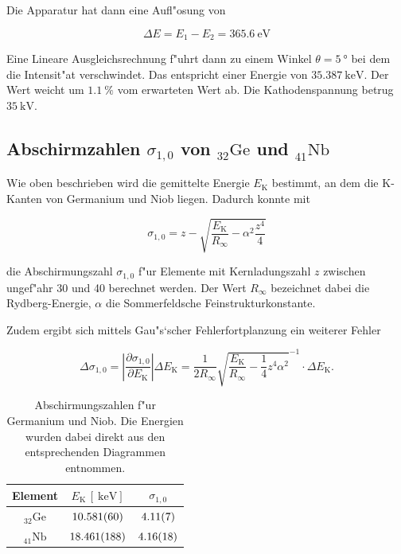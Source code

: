 		Die Apparatur hat dann eine Aufl"osung von

		\begin{equation}
			\Delta E = E_1 - E_2 = \SI{365.6}{\electronvolt} \nonumber
		\end{equation}

		Eine Lineare Ausgleichsrechnung f"uhrt dann zu einem Winkel $\theta = \SI{5}{\degree}$ bei dem die Intensit"at verschwindet.
		Das entspricht einer Energie von $\SI{35.387}{\kilo \electronvolt}$. Der Wert weicht um $\SI{1.1}{\percent}$ vom erwarteten Wert ab. Die Kathodenspannung betrug $\SI{35}{\kilo \volt}$.

	\subsection{Abschirmzahlen $\sigma_{1,0}$ von ${}_{32}^{}\mathrm{Ge}$ und ${}_{41}^{}\mathrm{Nb}$}
		\label{subsec:abschirm1}
		Wie oben beschrieben wird die gemittelte Energie $E_\mathrm{K}$ bestimmt, an dem die K-Kanten von Germanium und Niob liegen. 
		Dadurch konnte mit 

		\begin{equation}
			\sigma_{1,0} = z - \sqrt{\frac{E_\mathrm{K}}{R_\infty} - \alpha^2 \frac{z^4}{4}} \nonumber
		\end{equation}

		die Abschirmungszahl $\sigma_{1,0}$ f"ur Elemente mit Kernladungszahl $z$ zwischen ungef"ahr 30 und 40 berechnet werden.
		Der Wert $R_\infty$ bezeichnet dabei die Rydberg-Energie, $\alpha$ die Sommerfeldsche Feinstrukturkonstante.

		Zudem ergibt sich mittels Gau"s`scher Fehlerfortplanzung ein weiterer Fehler

		\begin{equation}
			\Delta \sigma_{1,0} = \left| \frac{\partial \sigma_{1,0}}{\partial E_\mathrm{K}} \right| \Delta E_\mathrm{K} =
			\frac{1}{2 R_{\infty}} \sqrt{\frac{E_\mathrm{K}}{R_\infty} - \frac{1}{4} z^4 \alpha^2}^{-1}
			\cdot \Delta E_\mathrm{K} . \nonumber
		\end{equation}

		\begin{table}[h!]
			\centering
				\caption{Abschirmungszahlen f"ur Germanium und Niob. Die Energien wurden dabei direkt aus den entsprechenden Diagrammen entnommen.}
			\begin{tabular}{|c|c|c|}
				\hline
				Element & 
				$E_\mathrm{K}\,[\SI{}{\kilo \electronvolt}]$ & 
				$\sigma_{1,0}$ \\
				\hline \hline
				${}_{32}^{}\mathrm{Ge}$ & $\SI{10.581 (60)}{}$ & $\SI{4.11 (7)}{}$ \\
				${}_{41}^{}\mathrm{Nb}$ & $\SI{18.461 (188)}{}$ & $\SI{4.16 (18)}{}$ \\
				\hline
			\end{tabular}
		\end{table}

